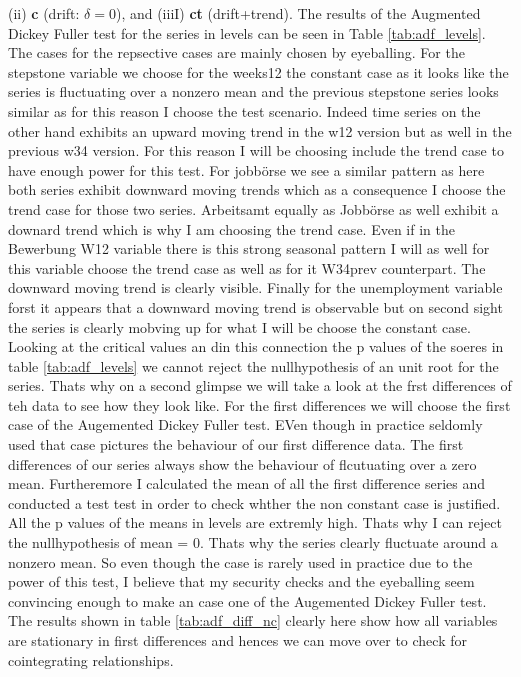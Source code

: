 \documentclass[12pt,a4paper]{article}
\begin{document}
(ii) \textbf{c} (drift: $\delta=0$), and (iiiI) \textbf{ct} (drift+trend).
The results of the Augmented Dickey Fuller test for the series in levels can be seen in Table \ref{tab:adf_levels}.
The cases for the repsective cases are mainly chosen by eyeballing. For the stepstone variable we choose for the weeks12 the constant case as it looks like the series is fluctuating over a nonzero mean and the previous stepstone series looks similar as for this reason I choose the test scenario. Indeed time series on the other hand exhibits an upward moving trend in the w12 version but as well in the previous w34 version. For this reason I will be choosing include the trend case to have enough power for this test. For jobbörse we see a similar pattern as here both series exhibit downward moving trends which as a consequence I choose the trend case for those two series. Arbeitsamt equally as Jobbörse as well exhibit a downard trend which is why I am choosing the trend case. Even if in the Bewerbung W12 variable there is this strong seasonal pattern I will as well for this variable choose the trend case as well as for it W34prev counterpart. The downward moving trend is clearly visible. Finally for the unemployment variable forst it appears that a downward moving trend is observable but on second sight the series is clearly mobving up for what I will be choose the constant case.
Looking at the critical values an din this connection the p values of the soeres in table \ref{tab:adf_levels}
we cannot reject the nullhypothesis of an unit root for the series.
Thats why on a second glimpse we will take a look at the frst differences of teh data to see how they look like. 
For the first differences we will choose the first case of the Augemented Dickey Fuller test. EVen though in practice seldomly used that case pictures the behaviour of our first difference data. The first differences of our series always show the behaviour of flcutuating over a zero mean. Furtheremore I calculated the mean of all the first difference series and conducted a test test in order to check whther the non constant case is justified. All the p values of the means in levels are extremly high. Thats why I can reject the nullhypothesis of mean = 0. Thats why the series clearly fluctuate around a nonzero mean.
So even though the case is rarely used in practice due to the power of this test, I believe that my security checks and the eyeballing seem convincing enough to make an case one of the Augemented Dickey Fuller test.
The results shown in table \ref{tab:adf_diff_nc} clearly here show how all variables are stationary in first differences and hences we can move over to check for cointegrating relationships.
\end{document}
